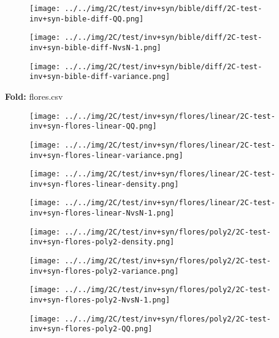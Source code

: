 \begin{figure}[H]
\centering	\texttt{[image: ../../img/2C/test/inv+syn/bible/diff/2C-test-inv+syn-bible-diff-QQ.png]}
\end{figure}
\begin{figure}[H]
\centering	\texttt{[image: ../../img/2C/test/inv+syn/bible/diff/2C-test-inv+syn-bible-diff-NvsN-1.png]}
\end{figure}
\begin{figure}[H]
\centering	\texttt{[image: ../../img/2C/test/inv+syn/bible/diff/2C-test-inv+syn-bible-diff-variance.png]}
\end{figure}
\textbf{Fold:} flores.csv
\begin{figure}[H]
\centering	\texttt{[image: ../../img/2C/test/inv+syn/flores/linear/2C-test-inv+syn-flores-linear-QQ.png]}
\end{figure}
\begin{figure}[H]
\centering	\texttt{[image: ../../img/2C/test/inv+syn/flores/linear/2C-test-inv+syn-flores-linear-variance.png]}
\end{figure}
\begin{figure}[H]
\centering	\texttt{[image: ../../img/2C/test/inv+syn/flores/linear/2C-test-inv+syn-flores-linear-density.png]}
\end{figure}
\begin{figure}[H]
\centering	\texttt{[image: ../../img/2C/test/inv+syn/flores/linear/2C-test-inv+syn-flores-linear-NvsN-1.png]}
\end{figure}
\begin{figure}[H]
\centering	\texttt{[image: ../../img/2C/test/inv+syn/flores/poly2/2C-test-inv+syn-flores-poly2-density.png]}
\end{figure}
\begin{figure}[H]
\centering	\texttt{[image: ../../img/2C/test/inv+syn/flores/poly2/2C-test-inv+syn-flores-poly2-variance.png]}
\end{figure}
\begin{figure}[H]
\centering	\texttt{[image: ../../img/2C/test/inv+syn/flores/poly2/2C-test-inv+syn-flores-poly2-NvsN-1.png]}
\end{figure}
\begin{figure}[H]
\centering	\texttt{[image: ../../img/2C/test/inv+syn/flores/poly2/2C-test-inv+syn-flores-poly2-QQ.png]}
\end{figure}
